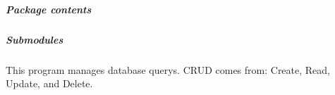 \documentclass[a4paper,landscape,10pt,english]{sphinxmanual}
\begin{document}
\subparagraph{Package contents}
\label{\detokenize{code_docs/simulation_API.model:module-simulation_API.model}}\label{\detokenize{code_docs/simulation_API.model:package-contents}}

\subparagraph{Submodules}
\label{\detokenize{code_docs/simulation_API.model:submodules}}

\subparagraph{}
\label{\detokenize{code_docs/simulation_API.model:module-simulation_API.model.crud}}\label{\detokenize{code_docs/simulation_API.model:simulation-api-model-crud}}
This program manages database querys.
CRUD comes from: Create, Read, Update, and Delete.
\end{document}
